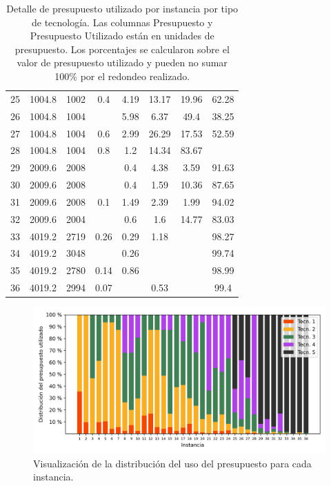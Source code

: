 \begin{table}
\begin{tabular}{cccccccc}
      25 & 1004.8 & 1002 & 0.4 & 4.19 & 13.17 & 19.96 & 62.28 \\
      26 & 1004.8 & 1004 &  & 5.98 & 6.37 & 49.4 & 38.25 \\
      27 & 1004.8 & 1004 & 0.6 & 2.99 & 26.29 & 17.53 & 52.59 \\
      28 & 1004.8 & 1004 & 0.8 & 1.2 & 14.34 & 83.67 &  \\
      29 & 2009.6 & 2008 &  & 0.4 & 4.38 & 3.59 & 91.63 \\
      30 & 2009.6 & 2008 &  & 0.4 & 1.59 & 10.36 & 87.65 \\
      31 & 2009.6 & 2008 & 0.1 & 1.49 & 2.39 & 1.99 & 94.02 \\
      32 & 2009.6 & 2004 &  & 0.6 & 1.6 & 14.77 & 83.03 \\
      33 & 4019.2 & 2719 & 0.26 & 0.29 & 1.18 &  & 98.27 \\
      34 & 4019.2 & 3048 &  & 0.26 &  &  & 99.74 \\
      35 & 4019.2 & 2780 & 0.14 & 0.86 &  &  & 98.99 \\
      36 & 4019.2 & 2994 & 0.07 &  & 0.53 &  & 99.4 \\
      \bottomrule
  \end{tabular}
  \caption{Detalle de presupuesto utilizado por instancia por tipo de tecnología. Las columnas Presupuesto y Presupuesto Utilizado están en unidades de presupuesto. Los porcentajes se calcularon sobre el valor de presupuesto utilizado y pueden no sumar 100\% por el redondeo realizado.} \label{table:sensibilitybudgetusage}
\end{table}

\begin{figure}[h!]
  \centering
  \includegraphics[width=14cm]{../resources/budget_use_by_infra.png}
  \caption{Visualización de la distribución del uso del presupuesto para cada instancia.}
  \label{fig:sensibilitybudgetusage}
\end{figure}

